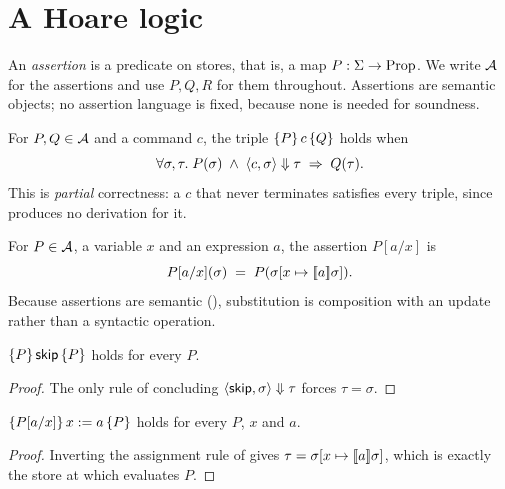 \section{A Hoare logic}
\label{sec:hoare}

\begin{definition}[assertions]
\label{def:assn}
An \emph{assertion} is a predicate on stores, that is, a map
$P : \Sigma \to \mathrm{Prop}$. We write $\mathcal{A}$ for the assertions and use
$P, Q, R$ for them throughout. Assertions are semantic objects; no assertion
language is fixed, because none is needed for soundness.
\end{definition}

\begin{definition}
\label{def:triple}
For $P, Q \in \mathcal{A}$ and a command $c$, the triple $\{P\}\, c \,\{Q\}$ holds
when
\[
  \forall \sigma, \tau .\;
  P(\sigma) \;\wedge\; \langle c, \sigma\rangle \Downarrow \tau \;\Rightarrow\; Q(\tau) .
\]
This is \emph{partial} correctness: a $c$ that never terminates satisfies every
triple, since  produces no derivation for it.
\end{definition}

\begin{definition}
\label{def:subst}
For $P \in \mathcal{A}$, a variable $x$ and an expression $a$, the assertion
$P[a/x]$ is
\[
  P[a/x](\sigma) \;=\; P(\sigma[x \mapsto [\![a]\!]\sigma]) .
\]
Because assertions are semantic (), substitution is composition
with an update rather than a syntactic operation.
\end{definition}

\begin{lemma}
\label{lem:hoare-skip}
$\{P\}\, \mathsf{skip} \,\{P\}$ holds for every $P$.
\end{lemma}

\begin{proof}
The only rule of  concluding $\langle \mathsf{skip}, \sigma\rangle \Downarrow \tau$
forces $\tau = \sigma$.
\end{proof}

\begin{lemma}
\label{lem:hoare-assign}
$\{P[a/x]\}\, x := a \,\{P\}$ holds for every $P$, $x$ and $a$.
\end{lemma}

\begin{proof}
Inverting the assignment rule of  gives
$\tau = \sigma[x \mapsto [\![a]\!]\sigma]$, which is exactly the store at which
 evaluates $P$.
\end{proof}

